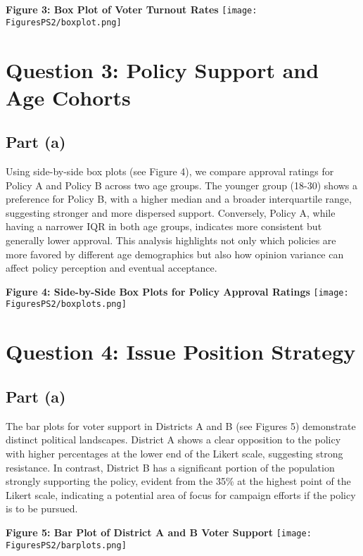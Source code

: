 \documentclass{article}
\begin{document}
\begin{center}
\textbf{Figure 3: Box Plot of Voter Turnout Rates}
\texttt{[image: FiguresPS2/boxplot.png]}
\end{center}

\section*{Question 3: Policy Support and Age Cohorts}

\subsection*{Part (a)}
Using side-by-side box plots (see Figure 4), we compare approval ratings for Policy A and Policy B across two age groups. The younger group (18-30) shows a preference for Policy B, with a higher median and a broader interquartile range, suggesting stronger and more dispersed support. Conversely, Policy A, while having a narrower IQR in both age groups, indicates more consistent but generally lower approval. This analysis highlights not only which policies are more favored by different age demographics but also how opinion variance can affect policy perception and eventual acceptance.

\begin{center}
\textbf{Figure 4: Side-by-Side Box Plots for Policy Approval Ratings}
\texttt{[image: FiguresPS2/boxplots.png]}
\end{center}

\section*{Question 4: Issue Position Strategy}

\subsection*{Part (a)}
The bar plots for voter support in Districts A and B (see Figures 5) demonstrate distinct political landscapes. District A shows a clear opposition to the policy with higher percentages at the lower end of the Likert scale, suggesting strong resistance. In contrast, District B has a significant portion of the population strongly supporting the policy, evident from the 35\% at the highest point of the Likert scale, indicating a potential area of focus for campaign efforts if the policy is to be pursued.

\begin{center}
\textbf{Figure 5: Bar Plot of District A and B Voter Support}
    \texttt{[image: FiguresPS2/barplots.png]}
\end{center}
\end{document}
